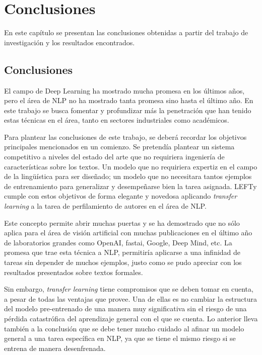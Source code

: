 
\chapter{Conclusiones}

\label{Chapter6} %

En este capítulo se presentan las conclusiones obtenidas a partir del trabajo de investigación y los resultados encontrados.

\section{Conclusiones}

El campo de Deep Learning ha mostrado mucha promesa en los últimos años, pero el área de NLP no ha mostrado tanta promesa sino hasta el último año. En este trabajo se busca fomentar y profundizar más la penetración que han tenido estas técnicas en el área, tanto en sectores industriales como académicos.

Para plantear las conclusiones de este trabajo, se deberá recordar los objetivos principales mencionados en un comienzo. Se pretendía plantear un sistema competitivo a niveles del estado del arte que no requiriera ingeniería de características sobre los textos. Un modelo que no requiriera expertiz en el campo de la lingüística para ser diseñado; un modelo que no necesitara tantos ejemplos de entrenamiento para generalizar y desempeñarse bien la tarea asignada. LEFTy cumple con estos objetivos de forma elegante y novedosa aplicando \textit{transfer learning} a la tarea de perfilamiento de autores en el área de NLP.

Este concepto permite abrir muchas puertas y se ha demostrado que no sólo aplica para el área de visión artificial con muchas publicaciones en el último año de laboratorios grandes como OpenAI, fastai, Google, Deep Mind, etc. La promesa que trae esta técnica a NLP, permitiría aplicarse a una infinidad de tareas sin depender de muchos ejemplos, justo como se pudo apreciar con los resultados presentados sobre textos formales.

Sin embargo, \textit{transfer learning} tiene compromisos que se deben tomar en cuenta, a pesar de todas las ventajas que provee. Una de ellas es no cambiar la estructura del modelo pre-entrenado de una manera muy significativa sin el riesgo de una pérdida catastrófica del aprendizaje general con el que se cuenta. Lo anterior lleva también a la conclusión que se debe tener mucho cuidado al afinar un modelo general a una tarea específica en NLP, ya que se tiene el mismo riesgo si se entrena de manera desenfrenada.

